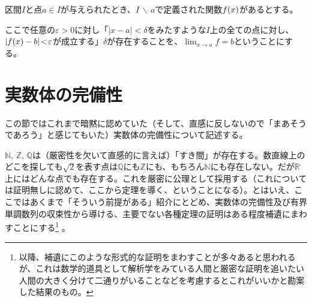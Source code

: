 \begin{defi}
    区間$I$と点$a\!\in\!I$が与えられたとき、$I\,\backslash\,a$で定義された関数$f\pare{x}$があるとする。

    ここで任意の$\varepsilon\!>\!0$に対し「$|x\!-\!a|\!<\!\delta$をみたすような$I$上の全ての点に対し、$|f\pare{x}-b|\!<\!\varepsilon$が成立する」$\delta$が存在することを、$\lim_{x\to{}a}f=b$ということにする。
\end{defi}




\clearpage
\section{実数体の完備性}
この節ではこれまで暗黙に認めていた（そして、直感に反しないので「まあそうであろう」と感じてもいた）実数体の完備性について記述する。

$\mathbb{N},\,\mathbb{Z},\,\mathbb{Q}$は（厳密性を欠いて直感的に言えば）「すき間」が存在する。数直線上のどこを探しても$\sqrt{2}$を表す点は$\mathbb{Q}$にも$\mathbb{Z}$にも、もちろん$\mathbb{N}$にも存在しない。だが$\mathbb{R}$上にはどんな点でも存在する。これを厳密に公理として採用する（これについては証明無しに認めて、ここから定理を導く、ということになる）。とはいえ、ここではあくまで「そういう前提がある」紹介にとどめ、実数体の完備性及び有界単調数列の収束性から導ける、主要でない各種定理の証明はある程度補遺にまわすことにする\footnote{以降、補遺にこのような形式的な証明をまわすことが多々あると思われるが、これは数学的道具として解析学をみている人間と厳密な証明を追いたい人間の大きく分けて二通りがいることなどを考慮するとこれがいいかと勘案した結果のもの。} 。